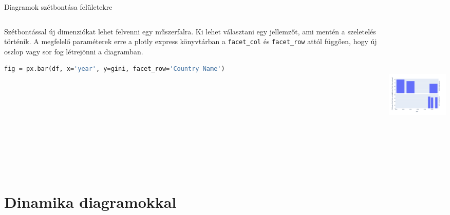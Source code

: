 \documentclass[english, aspectratio=169]{beamer}
\makeatletter
\let\origtableofcontents=\tableofcontents
\def\tableofcontents{\@ifnextchar[{\origtableofcontents}{\gobbletableofcontents}}
\def\gobbletableofcontents#1{\origtableofcontents}
\makeatother
\begin{document}
	\begin{frame}[fragile]{Diagramok szétbontása felületekre}
		\begin{columns}
			\begin{column}{.5\textwidth}
				Szétbontással új dimenziókat lehet felvenni egy műszerfalra. Ki lehet választani egy jellemzőt, ami mentén a szeletelés történik. A megfelelő paraméterek erre a plotly express könyvtárban a \texttt{facet\_col} és \texttt{facet\_row} attól függően, hogy új oszlop vagy sor fog létrejönni a diagramban. \par\medskip
				\begin{lstlisting}[language=python]
fig = px.bar(df, x='year', y=gini, facet_row='Country Name')				
				\end{lstlisting}
			\end{column}
			\begin{column}{.5\textwidth}
				\begin{center}
					\includegraphics[width=7cm, height=7cm, keepaspectratio]{images/plots_23.png}
				\end{center}
			\end{column}
		\end{columns}
	\end{frame}
	
	\section{Dinamika diagramokkal}
	
	\begin{frame}{}
		\tableofcontents[currentsection]
	\end{frame}
	
\end{document}
